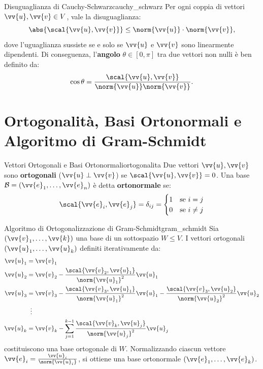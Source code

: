 \begin{teorema}{Disuguaglianza di Cauchy-Schwarz}{cauchy_schwarz}
Per ogni coppia di vettori $\vv{u}, \vv{v} \in V$, vale la disuguaglianza:
\begin{equation}
    \abs{\scal{\vv{u}, \vv{v}}} \le \norm{\vv{u}} \cdot \norm{\vv{v}},
\end{equation}
dove l'uguaglianza sussiste se e solo se $\vv{u}$ e $\vv{v}$ sono linearmente dipendenti.
Di conseguenza, l'\textbf{angolo} $\theta \in [0, \pi]$ tra due vettori non nulli è ben definito da:
\begin{equation}
    \cos\theta = \frac{\scal{\vv{u}, \vv{v}}}{\norm{\vv{u}} \norm{\vv{v}}}.
\end{equation}
\end{teorema}

\section{Ortogonalità, Basi Ortonormali e Algoritmo di Gram-Schmidt}

\begin{definizione}{Vettori Ortogonali e Basi Ortonormali}{ortogonalita}
Due vettori $\vv{u}, \vv{v}$ sono \textbf{ortogonali} ($\vv{u} \perp \vv{v}$) se $\scal{\vv{u}, \vv{v}} = 0$.
Una base $\mathcal{B} = (\vv{e}_1, \dots, \vv{e}_n)$ è detta \textbf{ortonormale} se:
\begin{equation}
    \scal{\vv{e}_i, \vv{e}_j} = \delta_{ij} = \begin{cases} 1 & \text{se } i = j \\ 0 & \text{se } i \neq j \end{cases}
\end{equation}
\end{definizione}

\begin{teorema}{Algoritmo di Ortogonalizzazione di Gram-Schmidt}{gram_schmidt}
Sia $(\vv{v}_1, \dots, \vv{k})$ una base di un sottospazio $W \le V$. I vettori ortogonali $(\vv{u}_1, \dots, \vv{u}_k)$ definiti iterativamente da:
\begin{align}
    \vv{u}_1 &= \vv{v}_1 \\
    \vv{u}_2 &= \vv{v}_2 - \frac{\scal{\vv{v}_2, \vv{u}_1}}{\norm{\vv{u}_1}^2} \vv{u}_1 \\
    \vv{u}_3 &= \vv{v}_3 - \frac{\scal{\vv{v}_3, \vv{u}_1}}{\norm{\vv{u}_1}^2} \vv{u}_1 - \frac{\scal{\vv{v}_3, \vv{u}_2}}{\norm{\vv{u}_2}^2} \vv{u}_2 \\
    &\;\;\vdots \nonumber \\
    \vv{u}_k &= \vv{v}_k - \sum_{j=1}^{k-1} \frac{\scal{\vv{v}_k, \vv{u}_j}}{\norm{\vv{u}_j}^2} \vv{u}_j
\end{align}
costituiscono una base ortogonale di $W$. Normalizzando ciascun vettore $\vv{e}_i = \frac{\vv{u}_i}{\norm{\vv{u}_i}}$, si ottiene una base ortonormale $(\vv{e}_1, \dots, \vv{e}_k)$.
\end{teorema}

